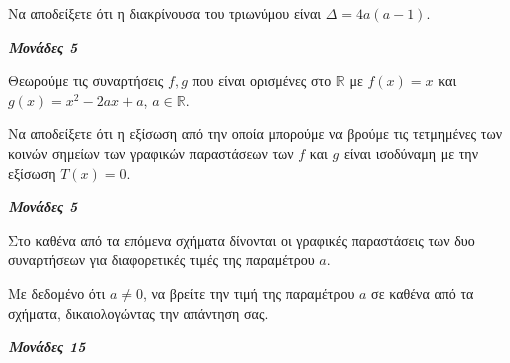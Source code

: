 \documentclass[11pt,a4paper,twoside]{book}
\newcommand{\monades}[1]{
\hspace*{\fill}
\textbf{\textit{\textcolor{maincolor}{Μονάδες #1}}}}
\begin{document}
\begin{alist}
\item Να αποδείξετε ότι η διακρίνουσα του τριωνύμου είναι $\Delta = 4a(a - 1)$.
\monades{5}
\item Θεωρούμε τις συναρτήσεις $f, g$ που είναι ορισμένες στο $\mathbb{R}$ με $f(x) = x$ και $g(x) = x^2 - 2a x + a$, $a \in \mathbb{R}$.

\begin{rlist}
\item Να αποδείξετε ότι η εξίσωση από την οποία μπορούμε να βρούμε τις τετμημένες των κοινών σημείων των γραφικών παραστάσεων των $f$ και $g$ είναι ισοδύναμη με την εξίσωση $T(x) = 0$.
\monades{5}
\item Στο καθένα από τα επόμενα σχήματα δίνονται οι γραφικές παραστάσεις των δυο συναρτήσεων για διαφορετικές τιμές της παραμέτρου $a$.

Με δεδομένο ότι $a \neq 0$, να βρείτε την τιμή της παραμέτρου $a$ σε καθένα από τα σχήματα, δικαιολογώντας την απάντηση σας.
\monades{15}
\end{rlist}
\end{alist}
\end{document}
